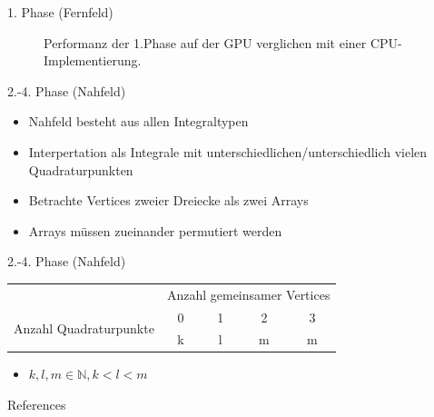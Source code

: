 \documentclass[10pt]{beamer}
\begin{document}
\begin{frame}{1. Phase (Fernfeld)}
  \begin{figure}
    \centering
    \caption{Performanz der 1.Phase auf der GPU verglichen mit einer
             CPU-Implementierung.}
  \end{figure}
\end{frame}

\begin{frame}{2.-4. Phase (Nahfeld)}
  \begin{itemize}
    \item Nahfeld besteht aus allen Integraltypen
    \item Interpertation als Integrale mit unterschiedlichen/unterschiedlich
          vielen Quadraturpunkten
    \item Betrachte Vertices zweier Dreiecke als zwei Arrays
    \item Arrays müssen zueinander permutiert werden\footnotemark[1]
  \end{itemize}
  \footnotesize
  \normalsize
\end{frame}

\begin{frame}{2.-4. Phase (Nahfeld)}
  \begin{tabular}{ccccc} \toprule
     & \multicolumn{4}{c}{Anzahl gemeinsamer Vertices} \\ \cmidrule{2-5}
    \multirow{2}{*}{Anzahl Quadraturpunkte} & 0 & 1 & 2 & 3 \\ \cmidrule{2-5}
     & k & l & m & m \\
    \bottomrule
  \end{tabular}
  \begin{itemize}
    \item \(k, l, m \in \mathbb{N}, k < l < m\)
  \end{itemize}
\end{frame}

\begin{frame}[allowframebreaks]{References}

  
  

\end{frame}
\end{document}
